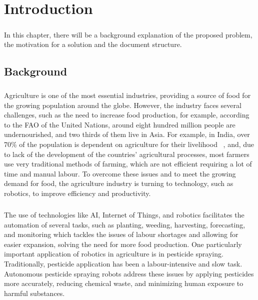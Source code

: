 
%

\chapter{Introduction}
\label{cha:introduction}
\paragraph{}In this chapter, there will be a background explanation of the proposed problem, 
the motivation for a solution and the document structure.

\section{Background}
\label{sec:background} 
\paragraph{}Agriculture is one of the most essential industries, providing a source of food for the growing population 
around the globe. However, the industry faces several challenges, such as the need to increase food production, 
for example, according to the \gls{FAO} of the United Nations, around eight hundred million 
people are undernourished, and two thirds of them live in Asia. For example, in India, over 70\% of the population 
is dependent on agriculture for their livelihood ~\cite{agriIndia}, and, due to lack of the development of 
the countries’ agricultural processes, most farmers use very traditional methods of farming, which are not efficient 
requiring a lot of time and manual labour. To overcome these issues and to meet the growing demand for food,
the agriculture industry is turning to technology, such as robotics, to improve efficiency and productivity.
\paragraph{}The use of technologies like AI, Internet of Things, and robotics facilitates the automation of 
several tasks, such as planting, weeding, harvesting, forecasting, and monitoring which tackles the issues of 
labour shortages and allowing for easier expansion, solving the need for more food production. One particularly important application of robotics in agriculture is in pesticide spraying. 
Traditionally, pesticide application has been a labour-intensive and slow task. Autonomous pesticide 
spraying robots address these issues by applying pesticides more accurately, reducing chemical waste, and 
minimizing human exposure to harmful substances.


